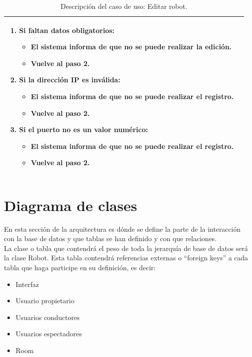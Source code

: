 \begin{table}[H]
\begin{center}
\begin{tabular}{|p{3.5cm}|p{10cm}|}
{\begin{enumerate}
         
          \item Si faltan datos obligatorios:
	  \begin{itemize}
	    \item El sistema informa de que no se puede realizar la edición.
	    \item Vuelve al paso 2.
	  \end{itemize}
	    
	  \item Si la dirección IP es inválida:
	  \begin{itemize}
	    \item El sistema informa de que no se puede realizar el registro.
	    \item Vuelve al paso 2.
	  \end{itemize}
	   
	  \item Si el puerto no es un valor numérico:
	   \begin{itemize}
	      \item El sistema informa de que no se puede realizar el registro.
	      \item Vuelve al paso 2.
	   \end{itemize}
	   
         \end{enumerate}
         }\\
     \hline
    \end{tabular}
  \end{center}
\caption{Descripción del caso de uso: Editar robot.}
\end{table}

\section{Diagrama de clases}

En esta sección de la arquitectura es dónde se define la parte de la interacción con la base de
datos y que tablas se han definido y con que relaciones.\\


La clase o tabla que contendrá el peso de toda la jerarquía de base de datos será la clase Robot. Esta tabla contendrá referencias externas o “foreign keys” a cada tabla que
haga participe en su definición, es decir:

\begin{itemize}
 \item Interfaz
 \item Usuario propietario
 \item Usuarios conductores
 \item Usuarios espectadores
 \item Room
\end{itemize}

